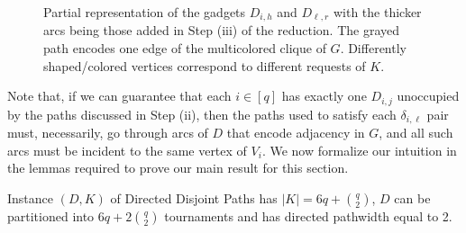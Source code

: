 \documentclass[a4paper,UKenglish,cleveref, autoref, thm-restate]{lipics-v2021}
\newcommand{\pname}[1]{{\sc #1}}
\begin{document}
\begin{enumerate}[(i)]
\begin{figure}[!htb]
      \caption{Partial representation of the gadgets $D_{i,h}$ and $D_{\ell, r}$ with the thicker
        arcs being those added in Step (iii) of the reduction. The grayed path encodes one
        edge of the multicolored clique of $G$. Differently shaped/colored vertices
      correspond to different requests of $K$.\label{fig:slivkins_s3}}
    \end{figure}
    \end{enumerate}
    Note that, if we can guarantee that each $i \in [q]$ has exactly one $D_{i,j}$
    unoccupied by the paths discussed in Step (ii), then the paths used to satisfy each
    $\delta_{i, \ell}$ pair must, necessarily, go through arcs of $D$ that encode
    adjacency in $G$, and all such arcs must be incident to the same vertex of $V_i$.
    We now formalize our intuition in the lemmas required to prove our main result for this section.

    \begin{observation}
      \label{obs:slivkins_structure}
      Instance $(D, K)$ of \pname{Directed Disjoint Paths} has $|K| = 6q + \binom{q}{2}$,
      $D$ can be partitioned into $6q + 2\binom{q}{2}$ tournaments and has directed
      pathwidth equal to 2.
    \end{observation}
\end{document}
